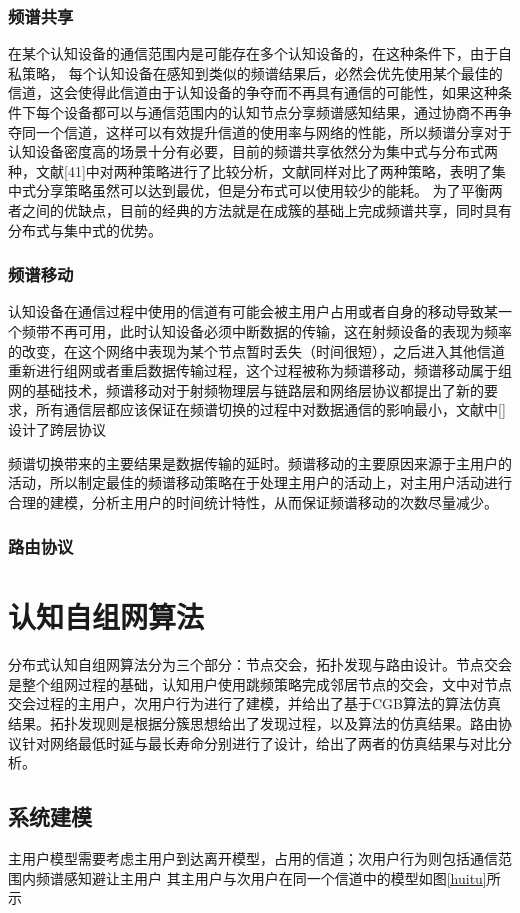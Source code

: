\documentclass[a4paper,AutoFakeBold,oneside,12pt]{book}
\begin{document}
\subsection{频谱共享}
  在某个认知设备的通信范围内是可能存在多个认知设备的，在这种条件下，由于自私策略， 每个认知设备在感知到类似的频谱结果后，必然会优先使用某个最佳的信道，这会使得此信道由于认知设备的争夺而不再具有通信的可能性，如果这种条件下每个设备都可以与通信范围内的认知节点分享频谱感知结果，通过协商不再争夺同一个信道，这样可以有效提升信道的使用率与网络的性能，所以频谱分享对于认知设备密度高的场景十分有必要，目前的频谱共享依然分为集中式与分布式两种，文献[41]中对两种策略进行了比较分析，文献\cite{uafs}同样对比了两种策略，表明了集中式分享策略虽然可以达到最优，但是分布式可以使用较少的能耗。
  为了平衡两者之间的优缺点，目前的经典的方法就是在成簇的基础上完成频谱共享，同时具有分布式与集中式的优势。
\subsection{频谱移动}
  认知设备在通信过程中使用的信道有可能会被主用户占用或者自身的移动导致某一个频带不再可用，此时认知设备必须中断数据的传输，这在射频设备的表现为频率的改变，在这个网络中表现为某个节点暂时丢失（时间很短），之后进入其他信道重新进行组网或者重启数据传输过程，这个过程被称为频谱移动，频谱移动属于组网的基础技术，频谱移动对于射频物理层与链路层和网络层协议都提出了新的要求，所有通信层都应该保证在频谱切换的过程中对数据通信的影响最小，文献中[]设计了跨层协议
  
  频谱切换带来的主要结果是数据传输的延时。频谱移动的主要原因来源于主用户的活动，所以制定最佳的频谱移动策略在于处理主用户的活动上，对主用户活动进行合理的建模，分析主用户的时间统计特性，从而保证频谱移动的次数尽量减少。
\subsection{路由协议}

\chapter{认知自组网算法}
  分布式认知自组网算法分为三个部分：节点交会，拓扑发现与路由设计。节点交会是整个组网过程的基础，认知用户使用跳频策略完成邻居节点的交会，文中对节点交会过程的主用户，次用户行为进行了建模，并给出了基于CGB算法的算法仿真结果。拓扑发现则是根据分簇思想给出了发现过程，以及算法的仿真结果。路由协议针对网络最低时延与最长寿命分别进行了设计，给出了两者的仿真结果与对比分析。
\section{系统建模}
  主用户模型需要考虑主用户到达离开模型，占用的信道；次用户行为则包括通信范围内频谱感知避让主用户
  其主用户与次用户在同一个信道中的模型如图\ref{huitu}所示
\end{document}

